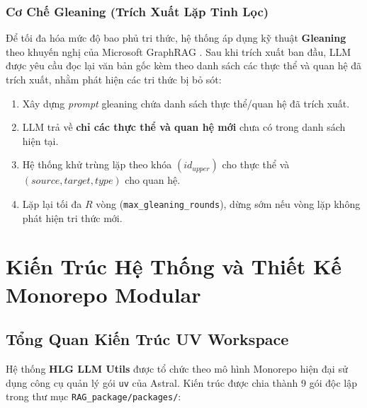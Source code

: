 \documentclass[11pt,a4paper]{report}
\begin{document}
\subsection{Cơ Chế Gleaning (Trích Xuất Lặp Tinh Lọc)}
Để tối đa hóa mức độ bao phủ tri thức, hệ thống áp dụng kỹ thuật \textbf{Gleaning} theo khuyến nghị của Microsoft GraphRAG \cite{edge2024graphrag}. Sau khi trích xuất ban đầu, LLM được yêu cầu đọc lại văn bản gốc kèm theo danh sách các thực thể và quan hệ đã trích xuất, nhằm phát hiện các tri thức bị bỏ sót:
\begin{enumerate}
    \item Xây dựng \textit{prompt} gleaning chứa danh sách thực thể/quan hệ đã trích xuất.
    \item LLM trả về \textbf{chỉ các thực thể và quan hệ mới} chưa có trong danh sách hiện tại.
    \item Hệ thống khử trùng lặp theo khóa $(id_{upper})$ cho thực thể và $(source, target, type)$ cho quan hệ.
    \item Lặp lại tối đa $R$ vòng (\texttt{max\_gleaning\_rounds}), dừng sớm nếu vòng lặp không phát hiện tri thức mới.
\end{enumerate}

\chapter{Kiến Trúc Hệ Thống và Thiết Kế Monorepo Modular}

\section{Tổng Quan Kiến Trúc UV Workspace}
Hệ thống \textbf{HLG LLM Utils} được tổ chức theo mô hình Monorepo hiện đại sử dụng công cụ quản lý gói \texttt{uv} của Astral. Kiến trúc được chia thành 9 gói độc lập trong thư mục \texttt{RAG\_package/packages/}:
\end{document}
